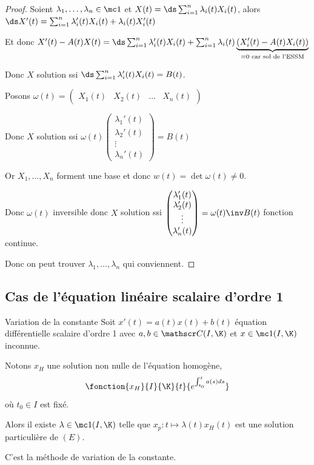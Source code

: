 \begin{proof}
    Soient $\lambda_1, \dots, \lambda_n \in \mc 1$ et $X(t) = \ds \sum_{i = 1}^{n} \lambda_i(t) X_i(t)$, alors
    $\ds X'(t) = \sum_{i = 1}^{n} \lambda_i'(t) X_i(t) + \lambda_i(t) X_i'(t)$

    Et donc $X'(t) - A(t) X(t) = \ds \sum_{i = 1}^{n} \lambda_i'(t) X_i(t) + \sum_{i = 1}^{n} \lambda_i(t) \underbrace{(X_i'(t) - A(t) X_i(t))}_{ = 0 \text{ car sol de l'ESSM}}$

    Donc $X$ solution ssi $\ds \sum_{i = 1}^{n} \lambda_i'(t) X_i(t) = B(t)$.

    Posons $\omega(t) = \begin{pmatrix}
    X_1(t) & X_2(t) & \dots & X_n(t)
    \end{pmatrix}$

    Donc $X$ solution ssi $\omega(t) \begin{pmatrix}
    \lambda_1'(t) \\ \lambda_2'(t) \\ \vdots \\ \lambda_n'(t)
    \end{pmatrix} = B(t)$

    Or $X_1, \dots, X_n$ forment une base et donc $w(t) = \det \omega(t) \neq 0$.

    Donc $\omega(t)$ inversible donc $X$ solution ssi $\begin{pmatrix}
    \lambda_1'(t) \\ \lambda_2'(t) \\ \vdots \\ \lambda_n'(t)
    \end{pmatrix} = \omega(t)\inv B(t)$ fonction continue. 

    Donc on peut trouver $\lambda_1, \dots, \lambda_n$ qui conviennent. 
\end{proof}


\subsection{Cas de l'équation linéaire scalaire d'ordre 1}

\begin{theoreme}{Variation de la constante}{}
    Soit $x'(t) = a(t) x(t) + b(t)$ équation différentielle scalaire d'ordre 1 avec 
    $a, b \in \mathscr C (I, \K)$ et $x \in \mc 1(I, \K)$ inconnue. 

    Notons $x_H$ une solution non nulle de l'équation homogène, 
    $$\fonction{x_H}{I}{\K}{t}{e^{\int_{t_0}^t a(s) ds}}$$ où $t_0 \in I$ est fixé.

    Alors il existe $\lambda \in \mc 1(I, \K)$ telle que 
    $x_p : t \mapsto \lambda(t) x_H(t)$ est une solution particulière de $(E)$. 

    C'est la méthode de variation de la constante. 
\end{theoreme}

